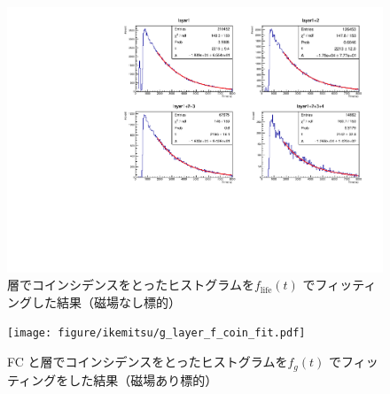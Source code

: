 \begin{figure}[H]
\centering
\includegraphics[height = 0.9\columnwidth , angle = -90]{figure/ikemitsu/lt_layercoin_fit.pdf}
\caption{層でコインシデンスをとったヒストグラムを$f_{\mathrm{life}}(t)$ でフィッティングした結果（磁場なし標的）}
\label{lt_layercoin_fit}
\end{figure}
  
\begin{figure}[H]
\centering
\texttt{[image: figure/ikemitsu/g\_layer\_f\_coin\_fit.pdf]}
\caption{FC と層でコインシデンスをとったヒストグラムを$f_{g}(t)$ でフィッティングをした結果（磁場あり標的）}
\label{g_layercoin_fit}
\end{figure}

